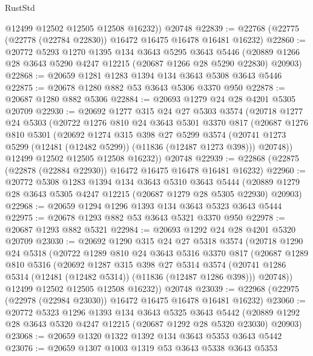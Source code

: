 \begin{lexlean}{RustStd}
\begin{coremodule}
        @12499
        @12502
        @12505
        @12508
        @16232))
    @20748
@22839 := @22768 (@22775 (@22778 (@22784 @22830)) @16472 @16475 @16478 @16481 @16232)
@22860 := @20772
    @5293
    @1270
    @1395
    @134
    @3643
    @5295
    @3643
    @5446
    (@20889 @1266 @28 @3643 @5290 @4247 @12215 (@20687 @1266 @28 @5290 @22830) @20903)
@22868 := @20659 @1281 @1283 @1394 @134 @3643 @5308 @3643 @5446
@22875 := @20678 @1280 @882 @53 @3643 @5306 @3370 @950
@22878 := @20687 @1280 @882 @5306
@22884 := @20693 @1279 @24 @28 @4201 @5305 @20709
@22930 := @20692
    @1277
    @315
    @24
    @27
    @5303
    @3574
    (@20718
      @1277
      @24
      @5303
      (@20722
        @1276
        @810
        @24
        @3643
        @5301
        @3370
        @817
        (@20687
          @1276
          @810
          @5301
          (@20692
            @1274
            @315
            @398
            @27
            @5299
            @3574
            (@20741 @1273 @5299 (@12481 (@12482 @5299)) (@11836 (@12487 @1273 @398)))
            @20748))
        @12499
        @12502
        @12505
        @12508
        @16232))
    @20748
@22939 := @22868 (@22875 (@22878 (@22884 @22930)) @16472 @16475 @16478 @16481 @16232)
@22960 := @20772
    @5308
    @1283
    @1394
    @134
    @3643
    @5310
    @3643
    @5444
    (@20889 @1279 @28 @3643 @5305 @4247 @12215 (@20687 @1279 @28 @5305 @22930) @20903)
@22968 := @20659 @1294 @1296 @1393 @134 @3643 @5323 @3643 @5444
@22975 := @20678 @1293 @882 @53 @3643 @5321 @3370 @950
@22978 := @20687 @1293 @882 @5321
@22984 := @20693 @1292 @24 @28 @4201 @5320 @20709
@23030 := @20692
    @1290
    @315
    @24
    @27
    @5318
    @3574
    (@20718
      @1290
      @24
      @5318
      (@20722
        @1289
        @810
        @24
        @3643
        @5316
        @3370
        @817
        (@20687
          @1289
          @810
          @5316
          (@20692
            @1287
            @315
            @398
            @27
            @5314
            @3574
            (@20741 @1286 @5314 (@12481 (@12482 @5314)) (@11836 (@12487 @1286 @398)))
            @20748))
        @12499
        @12502
        @12505
        @12508
        @16232))
    @20748
@23039 := @22968 (@22975 (@22978 (@22984 @23030)) @16472 @16475 @16478 @16481 @16232)
@23060 := @20772
    @5323
    @1296
    @1393
    @134
    @3643
    @5325
    @3643
    @5442
    (@20889 @1292 @28 @3643 @5320 @4247 @12215 (@20687 @1292 @28 @5320 @23030) @20903)
@23068 := @20659 @1320 @1322 @1392 @134 @3643 @5353 @3643 @5442
@23076 := @20659 @1307 @1003 @1319 @53 @3643 @5338 @3643 @5353

\end{coremodule}
\end{lexlean}
